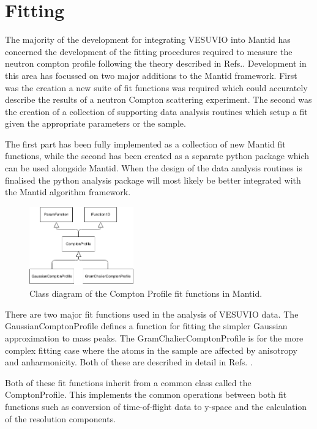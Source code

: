 \documentclass[paper=a4, fontsize=11pt]{scrartcl}	%
\numberwithin{equation}{section}															%
\numberwithin{figure}{section}																%
\numberwithin{table}{section}
\begin{document}
\section{Fitting}
\label{sec:fitting}
The majority of the development for integrating VESUVIO into Mantid has concerned the development of the fitting procedures required to measure the neutron compton profile following the theory described in Refs.\citep{mayers2012vesuvio}. Development in this area has focussed on two major additions to the Mantid framework. First was the creation a new suite of fit functions was required which could accurately describe the results of a neutron Compton scattering experiment. The second was the creation of a collection of supporting data analysis routines which setup a fit given the appropriate parameters or the sample. 

The first part has been fully implemented as a collection of new Mantid fit functions, while the second has been created as a separate python package which can be used alongside Mantid. When the design of the data analysis routines is finalised the python analysis package will most likely be better integrated with the Mantid algorithm framework.

\begin{figure}[H]
\centering
\includegraphics[width=0.4\textwidth]{img/uml/compton-class-diagram.png}
\caption{Class diagram of the Compton Profile fit functions in Mantid.}
\label{fig:compton-class-diagram}
\end{figure}

There are two major fit functions used in the analysis of VESUVIO data. The GaussianComptonProfile defines a function for fitting the simpler Gaussian approximation to mass peaks. The GramChalierComptonProfile is for the more complex fitting case where the atoms in the sample are affected by anisotropy and anharmonicity. Both of these are described in detail in Refs. \citep{mayers2012vesuvio}.

Both of these fit functions inherit from a common class called the ComptonProfile. This implements the common operations between both fit functions such as conversion of time-of-flight data to y-space and the calculation of the resolution components.
\end{document}
